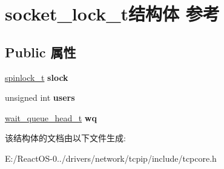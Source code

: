 \hypertarget{structsocket__lock__t}{}\section{socket\+\_\+lock\+\_\+t结构体 参考}
\label{structsocket__lock__t}
\subsection*{Public 属性}
\begin{DoxyCompactItemize}
\item 
\mbox{\label{structsocket__lock__t_abe4c3cb71e186e6eeb4d06f785d480ee}} 
\hyperlink{structspinlock__t}{spinlock\+\_\+t} {\bfseries slock}
\item 
\mbox{\label{structsocket__lock__t_a9157542f757febdbd8ae5bb264427a2c}} 
unsigned int {\bfseries users}
\item 
\mbox{\label{structsocket__lock__t_ae3ef256a887951cfd6c789c0960abfbb}} 
\hyperlink{struct____wait__queue__head}{wait\+\_\+queue\+\_\+head\+\_\+t} {\bfseries wq}
\end{DoxyCompactItemize}


该结构体的文档由以下文件生成\+:\begin{DoxyCompactItemize}
\item 
E\+:/\+React\+O\+S-\/0../drivers/network/tcpip/include/tcpcore.\+h\end{DoxyCompactItemize}
